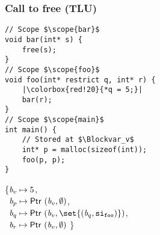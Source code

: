 \begin{frame}[fragile]
\frametitle{Call to free (TLU)}
\begin{minipage}{.5\textwidth}
\begin{verbatim}
// Scope $\scope{bar}$
void bar(int* s) {
    free(s);
}
// Scope $\scope{foo}$
void foo(int* restrict q, int* r) {
    |\colorbox{red!20}{*q = 5;}|
    bar(r);
}
// Scope $\scope{main}$
int main() {
    // Stored at $\Blockvar_v$
    int* p = malloc(sizeof(int));
    foo(p, p);
}
\end{verbatim}
\end{minipage}%
\begin{minipage}{.5\textwidth}
\executionannotation
{
\{$\textit{b}_v \mapsto 5$, \\
   \ $\textit{b}_p \mapsto \mathsf{Ptr} \ (\textit{b}_v, \emptyset)$, \\
    \ $\Blockvar_q \mapsto \ptr{(\Blockvar_v, \set{(\Blockvar_q, \scope{foo})})}$, \\
    \ $\textit{b}_r \mapsto \mathsf{Ptr} \ (\textit{b}_v, \emptyset)$ \}
}
{
}
\end{minipage}

\end{frame}

